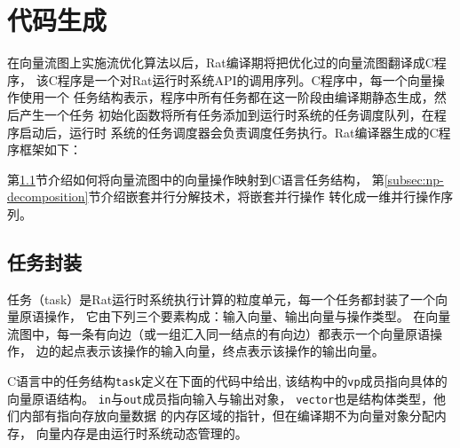 

\section{代码生成}\label{sec:code-generation}
在向量流图上实施流优化算法以后，Rat编译期将把优化过的向量流图翻译成C程序，
该C程序是一个对Rat运行时系统API的调用序列。C程序中，每一个向量操作使用一个
任务结构表示，程序中所有任务都在这一阶段由编译期静态生成，然后产生一个任务
初始化函数将所有任务添加到运行时系统的任务调度队列，在程序启动后，运行时
系统的任务调度器会负责调度任务执行。Rat编译器生成的C程序框架如下：


第\ref{subsec:task-encapsulation}节介绍如何将向量流图中的向量操作映射到C语言任务结构，
第\ref{subsec:np-decomposition}节介绍嵌套并行分解技术，将嵌套并行操作
转化成一维并行操作序列。

\subsection{任务封装}\label{subsec:task-encapsulation}
任务（task）是Rat运行时系统执行计算的粒度单元，每一个任务都封装了一个向量原语操作，
它由下列三个要素构成：输入向量、输出向量与操作类型。
在向量流图中，每一条有向边（或一组汇入同一结点的有向边）都表示一个向量原语操作，
边的起点表示该操作的输入向量，终点表示该操作的输出向量。

C语言中的任务结构\texttt{task}定义在下面的代码中给出,
该结构中的\texttt{vp}成员指向具体的向量原语结构。
\texttt{in}与\texttt{out}成员指向输入与输出对象，
\texttt{vector}也是结构体类型，他们内部有指向存放向量数据
的内存区域的指针，但在编译期不为向量对象分配内存，
向量内存是由运行时系统动态管理的。

